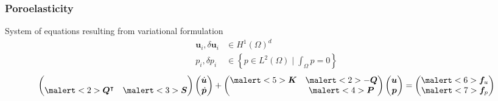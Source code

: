 \documentclass{beamer}
\begin{document}
\begin{frame}
  \frametitle{Poroelasticity}

  System of equations resulting from variational formulation
  \begin{align*}
    \bm u_i, \delta \bm u_i &\in H^1(\Omega)^d \\
    p_i, \delta p_i &\in \left\{ p \in L^2(\Omega) \;\Big|\; \int_\Omega p = 0 \right\}
  \end{align*}
  \[
    \begin{pmatrix} & \\ \malert<2>{\bm Q^\intercal} & \malert<3>{\bm S} \end{pmatrix}
    \begin{pmatrix} \dot{\bm u} \\ \dot{\bm p} \end{pmatrix} +
    \begin{pmatrix} \malert<5>{\bm K} & \malert<2>{- \bm Q} \\ & \malert<4>{\bm P} \end{pmatrix}
    \begin{pmatrix} \bm u \\ \bm p \end{pmatrix} =
    \begin{pmatrix} \malert<6>{\bm f_u} \\ \malert<7>{\bm f_p} \end{pmatrix}
  \]

  \begin{overlayarea}{\textwidth}{1cm}
    \begin{center}
    \end{center}
  \end{overlayarea}
\end{frame}
\end{document}
